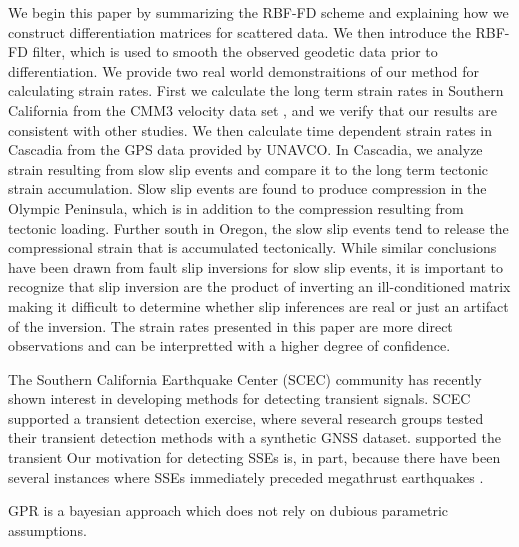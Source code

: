\documentclass[10pt,a4paper]{article}
\begin{document}
We begin this paper by summarizing the RBF-FD scheme and explaining how we construct differentiation matrices for scattered data. We then introduce the RBF-FD filter, which is used to smooth the observed geodetic data prior to differentiation.  We provide two real world demonstraitions of our method for calculating strain rates.  First we calculate the long term strain rates in Southern California from the CMM3 velocity data set \citep{Shen2011}, and we verify that our results are consistent with other studies. We then calculate time dependent strain rates in Cascadia from the GPS data provided by UNAVCO.  In Cascadia, we analyze strain resulting from slow slip events and compare it to the long term tectonic strain accumulation. Slow slip events are found to produce compression in the Olympic Peninsula, which is in addition to the compression resulting from tectonic loading.  Further south in Oregon, the slow slip events tend to release the compressional strain that is accumulated tectonically.  While similar conclusions have been drawn from fault slip inversions for slow slip events, it is important to recognize that slip inversion are the product of inverting an ill-conditioned matrix making it difficult to determine whether slip inferences are real or just an artifact of the inversion.  The strain rates presented in this paper are more direct observations and can be interpretted with a higher degree of confidence. 

The Southern California Earthquake Center (SCEC) community has recently shown interest in developing methods for detecting transient signals. SCEC supported a transient detection exercise, where several research groups tested their transient detection methods with a synthetic GNSS dataset.  supported the transient Our motivation for detecting SSEs is, in part, because there have been several instances where SSEs immediately preceded megathrust earthquakes \citep{Roeloffs2006}. 

GPR is a bayesian approach which does not rely on dubious parametric assumptions. 
\end{document}
